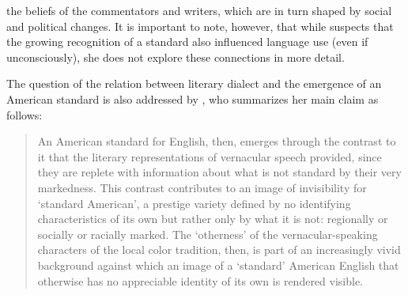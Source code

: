 the beliefs of the commentators and writers, which are in turn shaped by social and political changes. It is important to note, however, that  while \citet[183]{Cooley1992} suspects that the growing recognition of a standard also influenced language use (even if unconsciously), she does not explore these connections in more detail.

The question of the relation between literary dialect and the emergence of an American standard is also addressed by \citet{Minnick2010}, who summarizes her main claim as follows:

\begin{quote}
An American standard for English, then, emerges through the contrast to it that the literary representations of vernacular speech provided, since they are replete with information about what is not standard by their very markedness. This contrast contributes to an image of invisibility for ‘standard American’, a prestige variety defined by no identifying characteristics of its own but rather only by what it is not: regionally or socially or racially marked. The ‘otherness’ of the vernacular-speaking characters of the local color tradition, then, is part of an increasingly vivid background against which an image of a ‘standard’ American English that otherwise has no appreciable identity of its own is rendered visible. \citep[181]{Minnick2010}
\end{quote}


